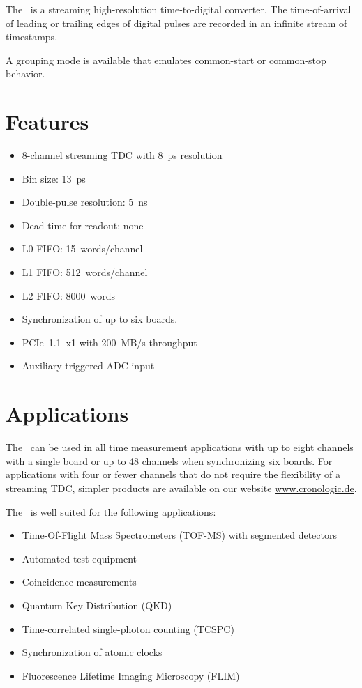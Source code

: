 The \deviceName\ is a streaming high-resolution time-to-digital converter. 
The time-of-arrival of leading or trailing edges of digital pulses are
recorded in an infinite stream of timestamps.

A grouping mode is available that emulates common-start or common-stop
behavior. 

\section{Features}
	\begin{itemize}
		\item 8-channel streaming TDC with 8~ps resolution
		\item Bin size: 13~ps
		\item Double-pulse resolution: 5~ns
		\item Dead time for readout: none
		\item L0 FIFO: 15~words/channel
		\item L1 FIFO: 512~words/channel
		\item L2 FIFO: 8000~words
		\item Synchronization of up to six boards.
		\item PCIe~1.1~x1 with 200~MB/s throughput
		\item Auxiliary triggered ADC input
	\end{itemize} 
\section{Applications}
The \deviceName\ can be used in all time measurement applications with up to
eight channels with a single board or up to 48 channels when synchronizing
six boards. For applications with four or fewer channels that do not require
the flexibility of a streaming TDC, simpler products are available on our
website \href{https://www.cronologic.de/products/products-overview#tdcdata}{%
www.cronologic.de}.

The \deviceName\ is well suited for the following applications:
\begin{itemize}
	\item Time-Of-Flight Mass Spectrometers (TOF-MS) with segmented detectors
	\item Automated test equipment
	\item Coincidence measurements
	\item Quantum Key Distribution (QKD)
	\item Time-correlated single-photon counting (TCSPC)
	\item Synchronization of atomic clocks
	\item Fluorescence Lifetime Imaging Microscopy (FLIM)
\end{itemize} 